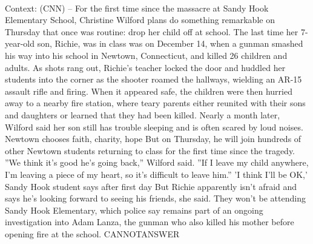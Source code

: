 \documentclass[11pt,a4paper, onecolumn]{article}
\begin{document}
\\ Context: (CNN) -- For the first time since the massacre at Sandy Hook Elementary School, Christine Wilford plans do something remarkable on Thursday that once was routine: drop her child off at school. The last time her 7-year-old son, Richie, was in class was on December 14, when a gunman smashed his way into his school in Newtown, Connecticut, and killed 26 children and adults. As shots rang out, Richie's teacher locked the door and huddled her students into the corner as the shooter roamed the hallways, wielding an AR-15 assault rifle and firing. When it appeared safe, the children were then hurried away to a nearby fire station, where teary parents either reunited with their sons and daughters or learned that they had been killed. Nearly a month later, Wilford said her son still has trouble sleeping and is often scared by loud noises. Newtown chooses faith, charity, hope But on Thursday, he will join hundreds of other Newtown students returning to class for the first time since the tragedy. ''We think it's good he's going back,'' Wilford said. ''If I leave my child anywhere, I'm leaving a piece of my heart, so it's difficult to leave him.'' 'I think I'll be OK,' Sandy Hook student says after first day But Richie apparently isn't afraid and says he's looking forward to seeing his friends, she said. They won't be attending Sandy Hook Elementary, which police say remains part of an ongoing investigation into Adam Lanza, the gunman who also killed his mother before opening fire at the school. CANNOTANSWER
\end{document}
